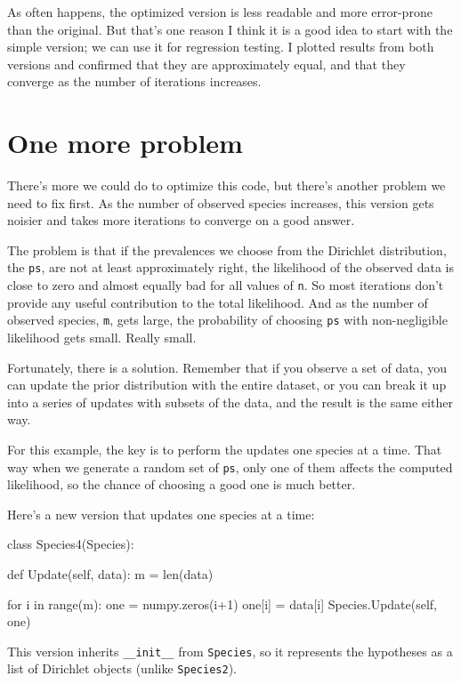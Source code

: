 \documentclass[12pt]{book}
\theoremstyle{exercise}
\begin{document}
As often happens, the optimized version is less readable and more
error-prone than the original.  But that's one reason I think it is
a good idea to start with the simple version; we can use it for
regression testing.  I plotted results from both versions and confirmed
that they are approximately equal, and that they converge as the
number of iterations increases.


\section{One more problem}

There's more we could do to optimize this code, but there's another
problem we need to fix first.  As the number of observed
species increases, this version gets noisier and takes more
iterations to converge on a good answer.

The problem is that if the prevalences we choose from the Dirichlet
distribution, the {\tt ps}, are not at least approximately right,
the likelihood of the observed data is close to zero and almost
equally bad for all values of {\tt n}.  So most iterations don't
provide any useful contribution to the total likelihood.  And as the
number of observed species, {\tt m}, gets large, the probability of
choosing {\tt ps} with non-negligible likelihood gets small.  Really
small.

Fortunately, there is a solution.  Remember that if you observe
a set of data, you can update the prior distribution with the
entire dataset, or you can break it up into a series of updates
with subsets of the data, and the result is the same either way.

For this example, the key is to perform the updates one species at
a time.  That way when we generate a random set of {\tt ps}, only
one of them affects the computed likelihood, so the chance of choosing
a good one is much better.

Here's a new version that updates one species at a time:

\begin{code}
class Species4(Species):

    def Update(self, data):
        m = len(data)

        for i in range(m):
            one = numpy.zeros(i+1)
            one[i] = data[i]            
            Species.Update(self, one)
\end{code}

This version inherits \verb"__init__" from {\tt Species}, so it
represents the hypotheses as a list of Dirichlet objects (unlike
{\tt Species2}).
\end{document}
